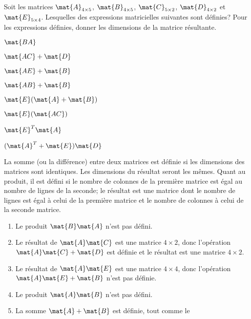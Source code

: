 \begin{exercice}
  Soit les matrices $\mat{A}_{4 \times 5}$, $\mat{B}_{4 \times 5}$,
  $\mat{C}_{5 \times 2}$, $\mat{D}_{4 \times 2}$ et $\mat{E}_{5 \times
    4}$. Lesquelles des expressions matricielles suivantes sont
  définies?  Pour les expressions définies, donner les dimensions de
  la matrice résultante.
  \begin{enumerate}
    \begin{multicols}{4}
    \item $\mat{BA}$
    \item $\mat{AC} + \mat{D}$
    \item $\mat{AE} + \mat{B}$
    \item $\mat{AB} + \mat{B}$
    \end{multicols}
    \vspace{-1.5\baselineskip}
    \begin{multicols}{4}
    \item $\mat{E}(\mat{A} + \mat{B})$
    \item $\mat{E}(\mat{AC})$
    \item $\mat{E}^T \mat{A}$
    \item $(\mat{A}^T + \mat{E})\mat{D}$
    \end{multicols}
  \end{enumerate}
  \begin{sol}
    La somme (ou la différence) entre deux matrices est définie si les
    dimensions des matrices sont identiques. Les dimensions du
    résultat seront les mêmes. Quant au produit, il est défini si le
    nombre de colonnes de la première matrice est égal au nombre de
    lignes de la seconde; le résultat est une matrice dont le nombre
    de lignes est égal à celui de la première matrice et le nombre de
    colonnes à celui de la seconde matrice.
    \begin{enumerate}
    \item Le produit $\mat{B} \mat{A}$ n'est pas défini.
    \item Le résultat de $\mat{A} \mat{C}$ est une matrice $4 \times
      2$, donc l'opération $\mat{A} \mat{C} + \mat{D}$ est définie et
      le résultat est une matrice $4 \times 2$.
    \item Le résultat de $\mat{A} \mat{E}$ est une matrice $4 \times
      4$, donc l'opération $\mat{A} \mat{E} + \mat{B}$ n'est pas
      définie.
    \item Le produit $\mat{A} \mat{B}$ n'est pas défini.
    \item La somme $\mat{A} + \mat{B}$ est définie, tout comme le

\end{enumerate}
\end{sol}
\end{exercice}

